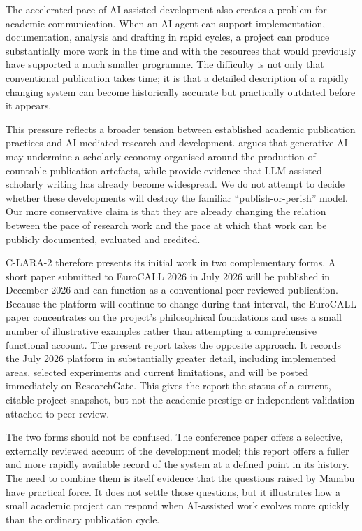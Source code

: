 The accelerated pace of AI-assisted development also creates a problem for
academic communication. When an AI agent can support implementation,
documentation, analysis and drafting in rapid cycles, a project can produce
substantially more work in the time and with the resources that would
previously have supported a much smaller programme. The difficulty is not
only that conventional publication takes time; it is that a detailed
description of a rapidly changing system can become historically accurate
but practically outdated before it appears.

This pressure reflects a broader tension between established academic
publication practices and AI-mediated research and development. \citet{Manabu2026} argues that generative AI may undermine a scholarly economy
organised around the production of countable publication artefacts, while
\citet{KobakEtAl2025} provide evidence that LLM-assisted scholarly writing
has already become widespread. We do not attempt to decide whether these
developments will destroy the familiar ``publish-or-perish'' model. Our
more conservative claim is that they are already changing the relation
between the pace of research work and the pace at which that work can be
publicly documented, evaluated and credited.

C-LARA-2 therefore presents its initial work in two complementary forms.
A short paper submitted to EuroCALL 2026 in July 2026 will be published
in December 2026 and can function as a conventional peer-reviewed
publication. Because the platform will continue to change during that
interval, the EuroCALL paper concentrates on the project's philosophical
foundations and uses a small number of illustrative examples rather than
attempting a comprehensive functional account. The present report takes
the opposite approach. It records the July 2026 platform in substantially
greater detail, including implemented areas, selected experiments and
current limitations, and will be posted immediately on ResearchGate.
This gives the report the status of a current, citable project snapshot,
but not the academic prestige or independent validation attached to peer
review.

The two forms should not be confused. The conference paper offers a
selective, externally reviewed account of the development model; this
report offers a fuller and more rapidly available record of the system at
a defined point in its history. The need to combine them is itself
evidence that the questions raised by Manabu have practical force. It
does not settle those questions, but it illustrates how a small academic
project can respond when AI-assisted work evolves more quickly than the
ordinary publication cycle.

